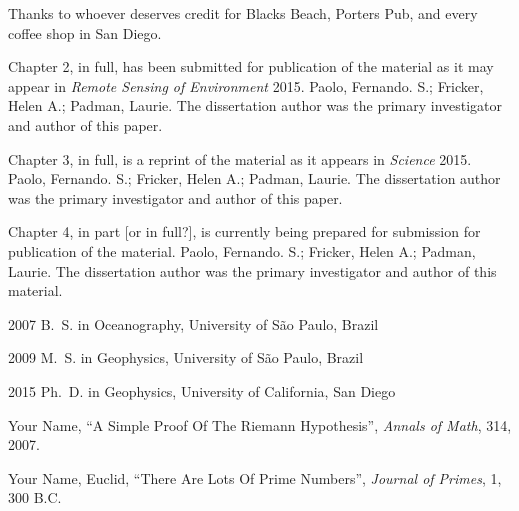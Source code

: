 \begin{frontmatter}
% 


%
\tableofcontents
\listoffigures  %
\listoftables   %



%
%
\begin{acknowledgements} 
 Thanks to whoever deserves credit for Blacks Beach, Porters Pub, and
 every coffee shop in San Diego. 

Chapter 2, in full, has been submitted for publication of the material
as it may appear in {\it Remote Sensing of Environment} 2015.
Paolo, Fernando. S.; Fricker, Helen A.; Padman, Laurie.
The dissertation author was the primary investigator and author of this paper.

Chapter 3, in full, is a reprint of the material as it appears
in {\it Science} 2015.
Paolo, Fernando. S.; Fricker, Helen A.; Padman, Laurie.
The dissertation author was the primary investigator and author of this paper.

Chapter 4, in part [or in full?], is currently being prepared for submission
for publication of the material.
Paolo, Fernando. S.; Fricker, Helen A.; Padman, Laurie.
The dissertation author was the primary investigator and author of this material.

 
\end{acknowledgements}


%
%
\begin{vitapage}
\begin{vita}
  \item[2007] B.~S. in Oceanography, University of S\~ao Paulo, Brazil
  \item[2009] M.~S. in Geophysics, University of S\~ao Paulo, Brazil
  \item[2015] Ph.~D. in Geophysics, University of California, San Diego 
\end{vita}
\begin{publications}
  \item Your Name, ``A Simple Proof Of The Riemann Hypothesis'', \emph{Annals of Math}, 314, 2007.
  \item Your Name, Euclid, ``There Are Lots Of Prime Numbers'', \emph{Journal of Primes}, 1, 300 B.C.
\end{publications}
\end{vitapage}



\end{frontmatter}
